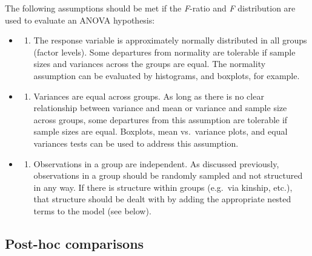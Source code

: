 \documentclass[
]{book}
\providecommand{\tightlist}{%
  \setlength{\itemsep}{0pt}\setlength{\parskip}{0pt}}
\begin{document}
The following assumptions should be met if the \emph{F}-ratio and \emph{F} distribution are used to evaluate an ANOVA hypothesis:

\begin{itemize}
\item
  \begin{enumerate}
  \def\labelenumi{\arabic{enumi}.}
  \tightlist
  \item
    The response variable is approximately normally distributed in all groups (factor levels). Some departures from normality are tolerable if sample sizes and variances across the groups are equal. The normality assumption can be evaluated by histograms, and boxplots, for example.
  \end{enumerate}
\item
  \begin{enumerate}
  \def\labelenumi{\arabic{enumi}.}
  \setcounter{enumi}{1}
  \tightlist
  \item
    Variances are equal across groups. As long as there is no clear relationship between variance and mean or variance and sample size across groups, some departures from this assumption are tolerable if sample sizes are equal. Boxplots, mean vs.~variance plots, and equal variances tests can be used to address this assumption.
  \end{enumerate}
\item
  \begin{enumerate}
  \def\labelenumi{\arabic{enumi}.}
  \setcounter{enumi}{2}
  \tightlist
  \item
    Observations in a group are independent. As discussed previously, observations in a group should be randomly sampled and not structured in any way. If there is structure within groups (e.g.~via kinship, etc.), that structure should be dealt with by adding the appropriate nested terms to the model (see below).
  \end{enumerate}
\end{itemize}

\hypertarget{post-hoc-comparisons}{%
\subsection{Post-hoc comparisons}\label{post-hoc-comparisons}}
\end{document}
